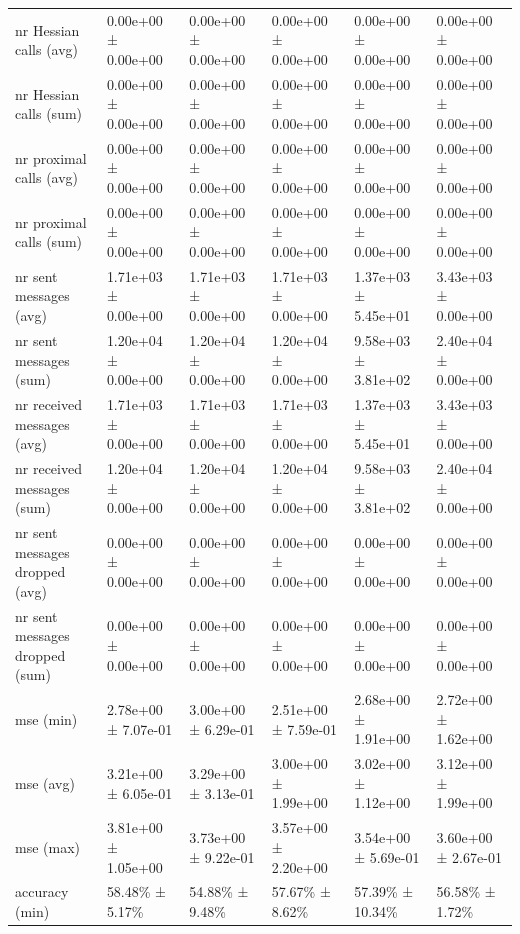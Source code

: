 \begin{tabular}{llllll}
 nr Hessian calls (avg)             & 0.00e+00 ± 0.00e+00 & 0.00e+00 ± 0.00e+00 & 0.00e+00 ± 0.00e+00 & 0.00e+00 ± 0.00e+00 & 0.00e+00 ± 0.00e+00 \\
 nr Hessian calls (sum)             & 0.00e+00 ± 0.00e+00 & 0.00e+00 ± 0.00e+00 & 0.00e+00 ± 0.00e+00 & 0.00e+00 ± 0.00e+00 & 0.00e+00 ± 0.00e+00 \\
 nr proximal calls (avg)            & 0.00e+00 ± 0.00e+00 & 0.00e+00 ± 0.00e+00 & 0.00e+00 ± 0.00e+00 & 0.00e+00 ± 0.00e+00 & 0.00e+00 ± 0.00e+00 \\
 nr proximal calls (sum)            & 0.00e+00 ± 0.00e+00 & 0.00e+00 ± 0.00e+00 & 0.00e+00 ± 0.00e+00 & 0.00e+00 ± 0.00e+00 & 0.00e+00 ± 0.00e+00 \\
 nr sent messages (avg)             & 1.71e+03 ± 0.00e+00 & 1.71e+03 ± 0.00e+00 & 1.71e+03 ± 0.00e+00 & 1.37e+03 ± 5.45e+01 & 3.43e+03 ± 0.00e+00 \\
 nr sent messages (sum)             & 1.20e+04 ± 0.00e+00 & 1.20e+04 ± 0.00e+00 & 1.20e+04 ± 0.00e+00 & 9.58e+03 ± 3.81e+02 & 2.40e+04 ± 0.00e+00 \\
 nr received messages (avg)         & 1.71e+03 ± 0.00e+00 & 1.71e+03 ± 0.00e+00 & 1.71e+03 ± 0.00e+00 & 1.37e+03 ± 5.45e+01 & 3.43e+03 ± 0.00e+00 \\
 nr received messages (sum)         & 1.20e+04 ± 0.00e+00 & 1.20e+04 ± 0.00e+00 & 1.20e+04 ± 0.00e+00 & 9.58e+03 ± 3.81e+02 & 2.40e+04 ± 0.00e+00 \\
 nr sent messages dropped (avg)     & 0.00e+00 ± 0.00e+00 & 0.00e+00 ± 0.00e+00 & 0.00e+00 ± 0.00e+00 & 0.00e+00 ± 0.00e+00 & 0.00e+00 ± 0.00e+00 \\
 nr sent messages dropped (sum)     & 0.00e+00 ± 0.00e+00 & 0.00e+00 ± 0.00e+00 & 0.00e+00 ± 0.00e+00 & 0.00e+00 ± 0.00e+00 & 0.00e+00 ± 0.00e+00 \\
 mse (min)                          & 2.78e+00 ± 7.07e-01 & 3.00e+00 ± 6.29e-01 & 2.51e+00 ± 7.59e-01 & 2.68e+00 ± 1.91e+00 & 2.72e+00 ± 1.62e+00 \\
 mse (avg)                          & 3.21e+00 ± 6.05e-01 & 3.29e+00 ± 3.13e-01 & 3.00e+00 ± 1.99e+00 & 3.02e+00 ± 1.12e+00 & 3.12e+00 ± 1.99e+00 \\
 mse (max)                          & 3.81e+00 ± 1.05e+00 & 3.73e+00 ± 9.22e-01 & 3.57e+00 ± 2.20e+00 & 3.54e+00 ± 5.69e-01 & 3.60e+00 ± 2.67e-01 \\
 accuracy (min)                     & 58.48\% ± 5.17\%      & 54.88\% ± 9.48\%      & 57.67\% ± 8.62\%      & 57.39\% ± 10.34\%     & 56.58\% ± 1.72\%      \\

\end{tabular}
